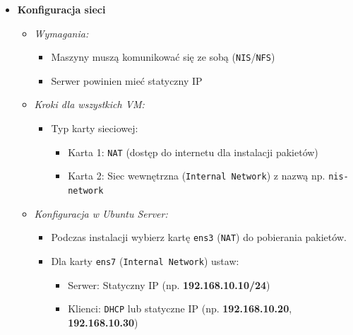 \begin{itemize}
\begin{itemize}
\begin{itemize}
          \end{itemize}
      \end{itemize}
      \clearpage
      \item \textbf{Konfiguracja sieci}
      \begin{itemize}
          \item \textit{Wymagania:}
          \begin{itemize}
              \item Maszyny muszą komunikować się ze sobą (\texttt{NIS}/\texttt{NFS})
              \item Serwer powinien mieć statyczny IP
          \end{itemize}
          \item \textit{Kroki dla wszystkich VM:}
          \begin{itemize}
              \item Typ karty sieciowej:
              \begin{itemize}
                  \item Karta 1: \texttt{NAT} (dostęp do internetu dla instalacji pakietów)
                  \item Karta 2: Siec wewnętrzna (\texttt{Internal Network}) z nazwą np. \texttt{nis-network}
              \end{itemize}
          \end{itemize}
          \item \textit{Konfiguracja w Ubuntu Server:}
          \begin{itemize}
              \item Podczas instalacji wybierz kartę \texttt{ens3} (\texttt{NAT}) do pobierania pakietów.
              \item Dla karty \texttt{ens7} (\texttt{Internal Network}) ustaw:
              \begin{itemize}
                  \item Serwer: Statyczny IP (np. \textbf{192.168.10.10/24})
                  \item Klienci: \texttt{DHCP} lub statyczne IP (np. \textbf{192.168.10.20}, \textbf{192.168.10.30})
              \end{itemize}
          \end{itemize}
      \end{itemize}
      

\end{itemize}
